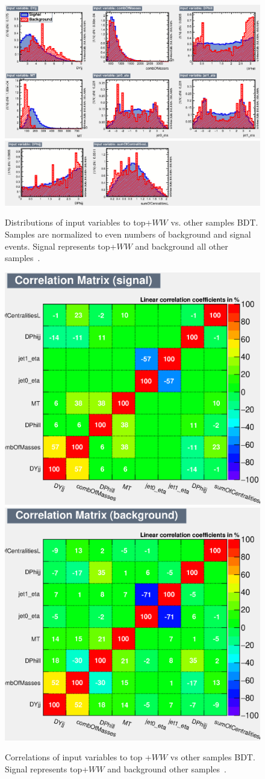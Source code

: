 \begin{figure}[!htbp]
    \centering
    \includegraphics[width=0.7\linewidth]{Pictures/Top+WWvsEverything/variables_id_c1.eps}
    \includegraphics[width=0.7\linewidth]{Pictures/Top+WWvsEverything/variables_id_c2.eps}
    \caption{Distributions of input variables to top+$WW$ vs. other samples BDT. Samples are normalized to even numbers of background and signal events. Signal represents top+$WW$ and background all other samples~\cite{ourSupportNote}.}
    \label{fig:TopBDTinput}
\end{figure}
\begin{figure}[!htbp]
\centering
  \includegraphics[width=.45\linewidth]{Pictures/Top+WWvsEverything/CorrelationMatrixS.eps}
  \includegraphics[width=.45\linewidth]{Pictures/Top+WWvsEverything/CorrelationMatrixB.eps}
\caption{Correlations of input variables to top +$WW$ vs other samples BDT. Signal represents top+$WW$ and background other samples~\cite{ourSupportNote}.}
\label{fig:TopcorrSB}
\end{figure}
